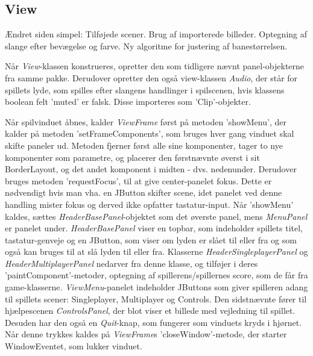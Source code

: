 \subsection{View}
Ændret siden simpel: Tilføjede scener. Brug af importerede billeder. Optegning af slange efter bevægelse og farve. Ny algoritme for justering af banestørrelsen.
\newline

Når \textit{View}-klassen konstrueres, opretter den som tidligere nævnt panel-objekterne fra samme pakke. Derudover opretter den også view-klassen \textit{Audio}, der står for spillets lyde, som spilles efter slangens handlinger i spilscenen, hvis klassens boolean felt 'muted' er falsk. Disse importeres som 'Clip'-objekter. 
\newline

Når spilvinduet åbnes, kalder \textit{ViewFrame} først på metoden 'showMenu', der kalder på metoden 'setFrameComponents', som bruges hver gang vinduet skal skifte paneler ud. Metoden fjerner først alle sine komponenter, tager to nye komponenter som parametre, og placerer den førstnævnte øverst i sit BorderLayout, og det andet komponent i midten - dvs. nedenunder. Derudover bruges metoden 'requestFocus', til at give center-panelet fokus. Dette er nødvendigt hvis man vha. en JButton skifter scene, idet panelet ved denne handling mister fokus og derved ikke opfatter tastatur-input. 
Når 'showMenu' kaldes, sættes \textit{HeaderBasePanel}-objektet som det øverste panel, mens \textit{MenuPanel} er panelet under. \textit{HeaderBasePanel} viser en topbar, som indeholder spillets titel, tastatur-genveje og en JButton, som viser om lyden er slået til eller fra og som også kan bruges til at slå lyden til eller fra. Klasserne \textit{HeaderSingleplayerPanel} og \textit{HeaderMultiplayerPanel} nedarver fra denne klasse, og tilføjer i deres 'paintComponent'-metoder, optegning af spillerens/spillernes score, som de får fra game-klasserne.
\textit{ViewMenu}-panelet indeholder JButtons som giver spilleren adang til spillets scener: Singleplayer, Multiplayer og Controls. Den sidstnævnte fører til hjælpescenen \textit{ControlsPanel}, der blot viser et billede med vejledning til spillet. Desuden har den også en \textit{Quit}-knap, som fungerer som vinduets kryds i hjørnet. Når denne trykkes kaldes på \textit{ViewFrame}s 'closeWindow'-metode, der starter WindowEventet, som lukker vinduet.

